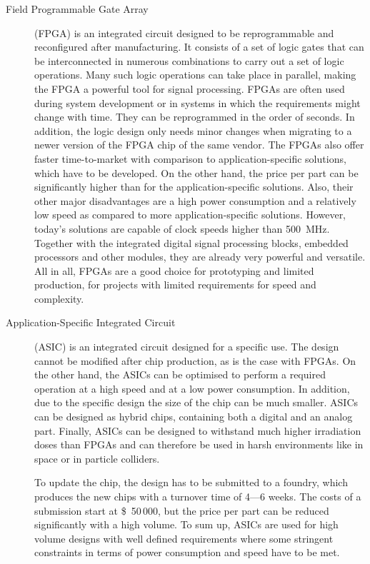 \begin{description}
\item[Field Programmable Gate Array] (FPGA) is an integrated circuit designed to be reprogrammable and reconfigured after manufacturing. It consists of a set of logic gates that can be interconnected in numerous combinations to carry out a set of logic operations. Many such logic operations can take place in parallel, making the FPGA a powerful tool for signal processing. FPGAs are often used during system development or in systems in which the requirements might change with time. They can be reprogrammed in the order of seconds. In addition, the logic design only needs minor changes when migrating to a newer version of the FPGA chip of the same vendor. The FPGAs also offer faster time-to-market with comparison to application-specific solutions, which have to be developed. On the other hand, the price per part can be significantly higher than for the application-specific solutions. Also, their other major disadvantages are a high power consumption and a relatively low speed as compared to more application-specific solutions. However, today's solutions are capable of clock speeds higher than 500~MHz. Together with the integrated digital signal processing blocks, embedded processors and other modules, they are already very powerful and versatile. All in all, FPGAs are a good choice for prototyping and limited production, for projects with limited requirements for speed and complexity.

\item[Application-Specific Integrated Circuit] (ASIC) is an integrated circuit designed for a specific use. The design cannot be modified after chip production, as is the case with FPGAs. On the other hand, the ASICs can be optimised to perform a required operation at a high speed and at a low power consumption. In addition, due to the specific design the size of the chip can be much smaller. ASICs can be designed as hybrid chips, containing both a digital and an analog part. Finally, ASICs can be designed to withstand much higher irradiation doses than FPGAs and can therefore be used in harsh environments like in space or in particle colliders.

To update the chip, the design has to be submitted to a foundry, which produces the new chips with a turnover time of 4---6 weeks. The costs of a submission start at \$~50\,000, but the price per part can be reduced significantly with a high volume. To sum up, ASICs are used for high volume designs with well defined requirements where some stringent constraints in terms of power consumption and speed have to be met.
\end{description} 

